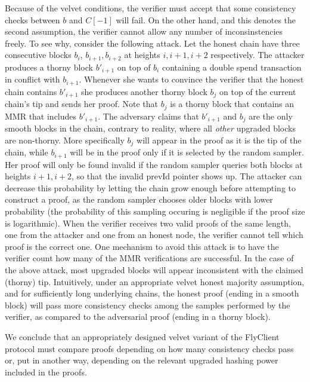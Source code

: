 	Because of the velvet conditions, the verifier must accept that some consistency checks between $b$ and $C[-1]$ will fail.
	On the other hand, and this denotes the second assumption, the verifier cannot allow any number of inconsinstencies freely. To see why,
	consider the following attack. Let the honest chain have three consecutive blocks $b_i$, $b_{i+1}, b_{i+2}$ at heights $i, i+1, i+2$ respectively. The attacker 
	produces a thorny block $b'_{i+1}$ on top of $b_i$ containing a double spend transaction in conflict with $b_{i+1}$.
	Whenever she wants to convince the verifier that the honest chain contains $b'_{i+1}$ she produces another thorny block $b_j$ on top of the current chain's tip 
	and sends her proof. Note that $b_j$ is a thorny block that contains an MMR that includes
	$b'_{i+1}$. The adversary claims that $b'_{i+1}$ and $b_j$ are the only smooth blocks in the chain, contrary to reality, where all \emph{other} upgraded blocks 
	are non-thorny.
	More specifically $b_j$ will appear in the proof as it is the tip of the chain, while $b_{i+1}$ will be in the proof
	only if it is selected by the random sampler. Her proof will only be found invalid if the random sampler queries both blocks at heights $i+1, i+2$, so that 
	the invalid prevId pointer shows up. The attacker can decrease this probability
	by letting the chain grow enough before attempting to construct a proof, as the random sampler chooses older blocks with lower probability 
	(the probability of this sampling occuring is negligible if the proof size is logarithmic). 
	When the verifier receives two valid proofs of the same length, one from the attacker and one from an honest node,
	the verifier cannot tell which proof is the correct one. 
	One mechanism to avoid this attack is to have the verifier count how many of
	the MMR verifications are successful. In the case of the above attack, most upgraded blocks will appear inconsistent with the claimed (thorny) tip.
	Intuitively, under an appropriate velvet honest majority assumption, and for sufficiently long underlying chains, the honest proof (ending in a smooth block)
	will pass more consistency checks among the samples performed
	by the verifier, as compared to the adversarial proof (ending in a thorny block).

	We conclude that an appropriately designed velvet variant of the FlyClient protocol must compare proofs depending on how many
	consistency checks pass or, put in another way, depending on the relevant upgraded hashing power included in the proofs. 

